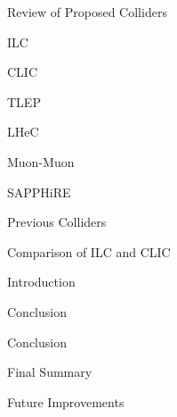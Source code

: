 \documentclass[12pt]{article}
\begin{document}
 \begin{section}{Review of Proposed Colliders}
 
     \begin{subsection}{ILC}
         
     \end{subsection}
     \begin{subsection}{CLIC}
         
     \end{subsection}
     \begin{subsection}{TLEP}
         
     \end{subsection}
     \begin{subsection}{LHeC}
         
     \end{subsection}
     \begin{subsection}{Muon-Muon}
         
     \end{subsection}
     \begin{subsection}{SAPPHiRE}
             
     \end{subsection}
     \begin{subsection}{Previous Colliders}
             
     \end{subsection}

 \end{section}
 
 \begin{section}{Comparison of ILC and CLIC}
 
     \begin{subsection}{Introduction}
         
     \end{subsection}
     
     
     
     \begin{subsection}{Conclusion}
         
     \end{subsection}
     
 \end{section}
 
 \begin{section}{Conclusion}
 
     \begin{subsection}{Final Summary}
         
     \end{subsection}
     \begin{subsection}{Future Improvements}
         
     \end{subsection}
 
 \end{section}
 
 \clearpage
 \printbibliography
 
\end{document}

